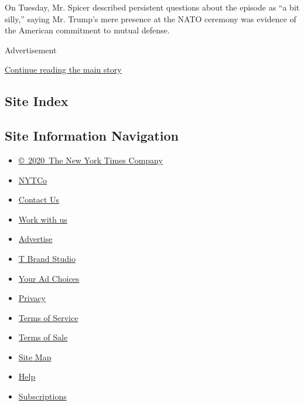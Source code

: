 On Tuesday, Mr. Spicer described persistent questions about the episode
as ``a bit silly,'' saying Mr. Trump's mere presence at the NATO
ceremony was evidence of the American commitment to mutual defense.

Advertisement

\protect\hyperlink{after-bottom}{Continue reading the main story}

\hypertarget{site-index}{%
\subsection{Site Index}\label{site-index}}

\hypertarget{site-information-navigation}{%
\subsection{Site Information
Navigation}\label{site-information-navigation}}

\begin{itemize}
\tightlist
\item
  \href{https://help.nytimes.com/hc/en-us/articles/115014792127-Copyright-notice}{©~2020~The
  New York Times Company}
\end{itemize}

\begin{itemize}
\tightlist
\item
  \href{https://www.nytco.com/}{NYTCo}
\item
  \href{https://help.nytimes.com/hc/en-us/articles/115015385887-Contact-Us}{Contact
  Us}
\item
  \href{https://www.nytco.com/careers/}{Work with us}
\item
  \href{https://nytmediakit.com/}{Advertise}
\item
  \href{http://www.tbrandstudio.com/}{T Brand Studio}
\item
  \href{https://www.nytimes.com/privacy/cookie-policy\#how-do-i-manage-trackers}{Your
  Ad Choices}
\item
  \href{https://www.nytimes.com/privacy}{Privacy}
\item
  \href{https://help.nytimes.com/hc/en-us/articles/115014893428-Terms-of-service}{Terms
  of Service}
\item
  \href{https://help.nytimes.com/hc/en-us/articles/115014893968-Terms-of-sale}{Terms
  of Sale}
\item
  \href{https://spiderbites.nytimes.com}{Site Map}
\item
  \href{https://help.nytimes.com/hc/en-us}{Help}
\item
  \href{https://www.nytimes.com/subscription?campaignId=37WXW}{Subscriptions}
\end{itemize}
